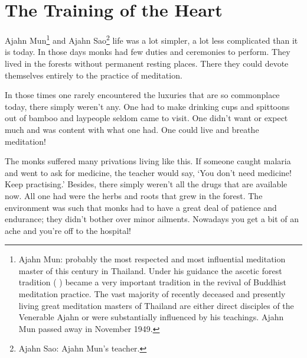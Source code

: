 
\chapter{The Training of the Heart}

 Ajahn Mun\footnote{Ajahn Mun: probably the most respected and most influential meditation master of this century in Thailand. Under his guidance the ascetic forest tradition ( ) became a very important tradition in the revival of Buddhist meditation practice. The vast majority of recently deceased and presently living great meditation masters of Thailand are either direct disciples of the Venerable Ajahn or were substantially influenced by his teachings. Ajahn Mun passed away in November 1949.} and Ajahn Sao\footnote{Ajahn Sao: Ajahn Mun's teacher.} life was a lot simpler, a lot less complicated than it is today. In those days monks had few duties and ceremonies to perform. They lived in the forests without permanent resting places. There they could devote themselves entirely to the practice of meditation.

In those times one rarely encountered the luxuries that are so commonplace today, there simply weren't any. One had to make drinking cups and spittoons out of bamboo and laypeople seldom came to visit. One didn't want or expect much and was content with what one had. One could live and breathe meditation!

The monks suffered many privations living like this. If someone caught malaria and went to ask for medicine, the teacher would say, `You don't need medicine! Keep practising.' Besides, there simply weren't all the drugs that are available now. All one had were the herbs and roots that grew in the forest. The environment was such that monks had to have a great deal of patience and endurance; they didn't bother over minor ailments. Nowadays you get a bit of an ache and you're off to the hospital!

